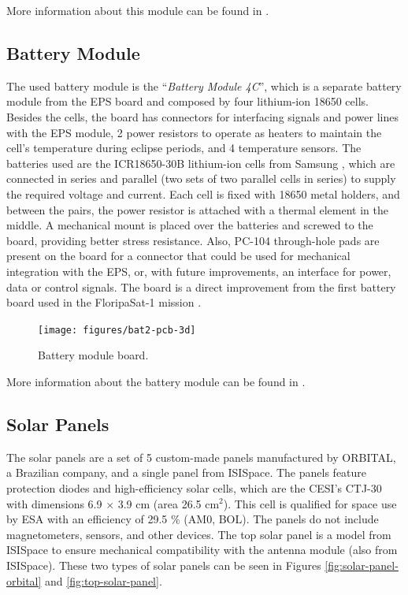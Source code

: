 More information about this module can be found in \cite{eps2}.

\subsection{Battery Module} \label{ssec:battery-module}

The used battery module is the ``\textit{Battery Module 4C}'', which is a separate battery module from the EPS board and composed by four lithium-ion 18650 cells. Besides the cells, the board has connectors for interfacing signals and power lines with the EPS module, 2 power resistors to operate as heaters to maintain the cell's temperature during eclipse periods, and 4 temperature sensors. The batteries used are the ICR18650-30B lithium-ion cells from Samsung \cite{icr18650-30b}, which are connected in series and parallel (two sets of two parallel cells in series) to supply the required voltage and current. Each cell is fixed with 18650 metal holders, and between the pairs, the power resistor is attached with a thermal element in the middle. A mechanical mount is placed over the batteries and screwed to the board, providing better stress resistance. Also, PC-104 through-hole pads are present on the board for a connector that could be used for mechanical integration with the EPS, or, with future improvements, an interface for power, data or control signals. The board is a direct improvement from the first battery board used in the FloripaSat-1 mission \cite{floripasat}.

\begin{figure}[!ht]
    \begin{center}
        \texttt{[image: figures/bat2-pcb-3d]}
        \caption{Battery module board.}
        \label{fig:battery-module-board}
    \end{center}
\end{figure}

More information about the battery module can be found in \cite{bat4c}.

\subsection{Solar Panels}

The solar panels are a set of 5 custom-made panels manufactured by ORBITAL, a Brazilian company, and a single panel from ISISpace. The panels feature protection diodes and high-efficiency solar cells, which are the CESI's CTJ-30 \cite{ctj30} with dimensions 6.9 $\times$ 3.9 cm (area 26.5 cm$^{2}$). This cell is qualified for space use by ESA with an efficiency of 29.5 \% (AM0, BOL). The panels do not include magnetometers, sensors, and other devices. The top solar panel is a model from ISISpace to ensure mechanical compatibility with the antenna module (also from ISISpace). These two types of solar panels can be seen in Figures \ref{fig:solar-panel-orbital} and \ref{fig:top-solar-panel}.

